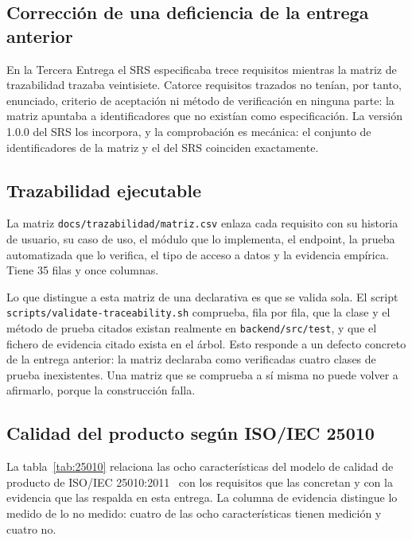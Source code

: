 \documentclass[11pt,a4paper]{article}
\begin{document}
\subsection{Corrección de una deficiencia de la entrega anterior}

En la Tercera Entrega el SRS especificaba trece requisitos mientras la matriz de
trazabilidad trazaba veintisiete. Catorce requisitos trazados no tenían, por
tanto, enunciado, criterio de aceptación ni método de verificación en ninguna
parte: la matriz apuntaba a identificadores que no existían como especificación.
La versión 1.0.0 del SRS los incorpora, y la comprobación es mecánica: el
conjunto de identificadores de la matriz y el del SRS coinciden exactamente.

\subsection{Trazabilidad ejecutable}

La matriz \texttt{docs\-/trazabilidad\-/matriz.csv} enlaza cada requisito con su
historia de usuario, su caso de uso, el módulo que lo implementa, el endpoint,
la prueba automatizada que lo verifica, el tipo de acceso a datos y la evidencia
empírica. Tiene 35 filas y once columnas.

Lo que distingue a esta matriz de una declarativa es que se valida sola. El
script \texttt{scripts\-/validate-traceability.sh} comprueba, fila por fila, que
la clase y el método de prueba citados existan realmente en
\texttt{backend\-/src\-/test}, y que el fichero de evidencia citado exista en el
árbol. Esto responde a un defecto concreto de la entrega anterior: la matriz
declaraba como verificadas cuatro clases de prueba inexistentes. Una matriz que
se comprueba a sí misma no puede volver a afirmarlo, porque la construcción
falla.

\subsection{Calidad del producto según ISO/IEC 25010}

La tabla~\ref{tab:25010} relaciona las ocho características del modelo de
calidad de producto de ISO/IEC 25010:2011~\cite{iso25010} con los requisitos que
las concretan y con la evidencia que las respalda en esta entrega. La columna de
evidencia distingue lo medido de lo no medido: cuatro de las ocho
características tienen medición y cuatro no.
\end{document}
